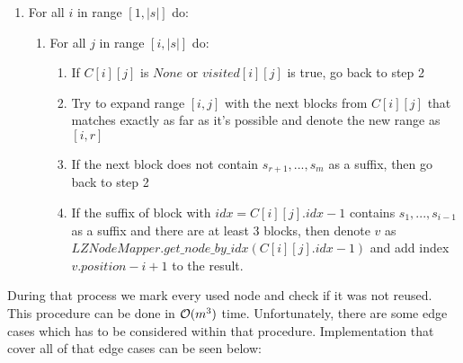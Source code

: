 \begin{enumerate}
    \item For all $i$ in range $[1, |s|]$ do:
    \begin{enumerate}
        \item For all $j$ in range $[i, |s|]$ do:
        \begin{enumerate}
            \item If $C[i][j]$ is $None$ or $visited[i][j]$ is true, go back to step 2
            \item Try to expand range $[i,j]$ with the next blocks from $C[i][j]$ that matches exactly as far as it's possible and denote the new range as $[i, r]$
            \item If the next block does not contain $s_{r+1},...,s_m$ as a suffix, then go back to step 2
            \item If the suffix of block with $idx = C[i][j].idx - 1$ contains $s_1,...,s_{i-1}$ as a suffix and there are at least 3 blocks, then denote $v$ as \\ $LZNodeMapper.get\_node\_by\_idx(C[i][j].idx-1)$ and add index \\ $v.position - i + 1$ to the result.
        \end{enumerate}
    \end{enumerate}
\end{enumerate}

During that process we mark every used node and check if it was not reused. This procedure can be done in $\mathcal{O}(m^3)$ time. Unfortunately, there are some edge cases which has to be considered within that procedure. Implementation that cover all of that edge cases can be seen below:

